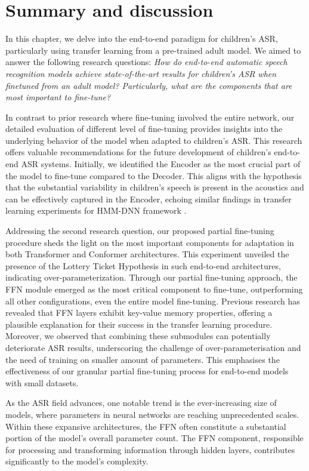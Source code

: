\section{Summary and discussion}

In this chapter, we delve into the end-to-end paradigm for children's ASR, particularly using transfer learning from a pre-trained adult model. We aimed to answer the following research questions: \textit{How do end-to-end automatic speech recognition models achieve state-of-the-art results for children's ASR when finetuned from an adult model? Particularly, what are the components that are most important to fine-tune?}

In contrast to prior research where fine-tuning involved the entire network, our detailed evaluation of different level of fine-tuning provides insights into the underlying behavior of the model when adapted to children's ASR. This research offers valuable recommendations for the future development of children's end-to-end ASR systems. Initially, we identified the Encoder as the most crucial part of the model to fine-tune compared to the Decoder. This aligns with the hypothesis that the substantial variability in children's speech is present in the acoustics and can be effectively captured in the Encoder, echoing similar findings in transfer learning experiments for HMM-DNN framework \cite{TFchildren}.

Addressing the second research question, our proposed partial fine-tuning procedure sheds the light on the most important components for adaptation in both Transformer and Conformer architectures. This experiment unveiled the presence of the Lottery Ticket Hypothesis in such end-to-end architectures, indicating over-parameterization. Through our partial fine-tuning approach, the FFN module emerged as the most critical component to fine-tune, outperforming all other configurations, even the entire model fine-tuning. Previous research \cite{geva2020transformer} has revealed that FFN layers exhibit key-value memory properties, offering a plausible explanation for their success in the transfer learning procedure. Moreover, we observed that combining these submodules can potentially deteriorate ASR results, underscoring the challenge of over-parameterisation and the need of training on smaller amount of parameters. This emphasises the effectiveness of our granular partial fine-tuning process for end-to-end models with small datasets.

As the ASR field advances, one notable trend is the ever-increasing size of models, where parameters in neural networks are reaching unprecedented scales. Within these expansive architectures, the FFN often constitute a substantial portion of the model's overall parameter count. The FFN component, responsible for processing and transforming information through hidden layers, contributes significantly to the model's complexity.

